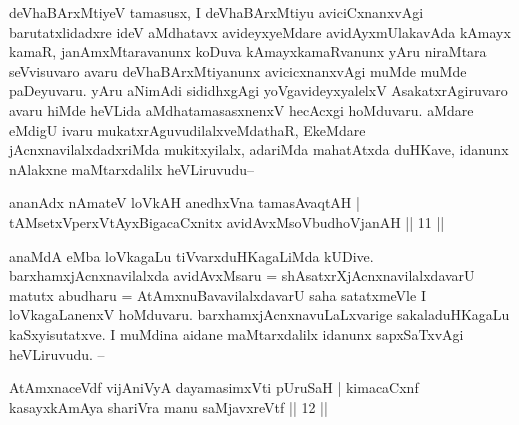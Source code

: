 
\begin{artha}
 deVhaBArxMtiyeV tamasusx, I deVhaBArxMtiyu aviciCxnanxvAgi barutatxlidadxre ideV aMdhatavx avideyxyeMdare avidAyxmUlakavAda kAmayx kamaR, janAmxMtaravanunx koDuva kAmayxkamaRvanunx yAru niraMtara seVvisuvaro avaru deVhaBArxMtiyanunx avicicxnanxvAgi muMde muMde paDeyuvaru. yAru aNimAdi sididhxgAgi yoVgavideyxyalelxV AsakatxrAgiruvaro avaru hiMde heVLida aMdhatamasasxnenxV hecAcxgi hoMduvaru. aMdare eMdigU ivaru mukatxrAguvudilalxveMdathaR, EkeMdare jAcnxnavilalxdadxriMda mukitxyilalx, adariMda mahatAtxda duHKave, idanunx nAlakxne maMtarxdalilx heVLiruvudu-- 
\end{artha}

\begin{shl}
ananAdx nAmateV loVkAH anedhxVna tamasAvaqtAH |\\
tAMsetxVperxVtAyxBigacaCxnitx avidAvxMsoV\s budhoVjanAH || 11 ||
\end{shl}

\begin{artha} %
anaMdA eMba loVkagaLu tiVvarxduHKagaLiMda kUDive. barxhamxjAcnxnavilalxda avidAvxMsaru = shAsatxrXjAcnxnavilalxdavarU matutx abudharu = AtAmxnuBavavilalxdavarU saha satatxmeVle I loVkagaLanenxV hoMduvaru. barxhamxjAcnxnavuLaLxvarige sakaladuHKagaLu kaSxyisutatxve. I muMdina aidane maMtarxdalilx idanunx sapxSaTxvAgi heVLiruvudu. --
\end{artha}

\begin{shl}
AtAmxnaceVdf vijAniVyA dayamasimxVti pUruSaH |
kimacaCxnf kasayxkAmAya shariVra manu saMjavxreVtf || 12 ||
\end{shl}

